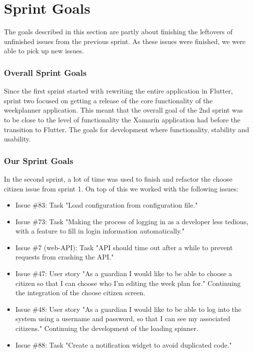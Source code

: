 \section{Sprint Goals}
\label{sect:sprintGoals2}
The goals described in this section are partly about finishing the leftovers of unfinished issues from the previous sprint. As these issues were finished, we were able to pick up new issues.

\subsubsection{Overall Sprint Goals}
Since the first sprint started with rewriting the entire application in Flutter, sprint two focused on getting a release of the core functionality of the weekplanner application. This meant that the overall goal of the 2nd sprint was to be close to the level of functionality the Xamarin application had before the transition to Flutter. The goals for development where functionality, stability and usability. 

\subsubsection{Our Sprint Goals}
In the second sprint, a lot of time was used to finish and refactor the choose citizen issue from sprint 1. On top of this we worked with the following issues:

\begin{itemize}
    \item Issue \#83: Task "Load configuration from configuration file."
    \item Issue \#73: Task "Making the process of logging in as a developer less tedious, with a feature to fill in login information automatically."
    \item Issue \#7 (web-API): Task "API should time out after a while to prevent requests from crashing the API."
    \item Issue \#47: User story "As a guardian I would like to be able to choose a citizen so that I can choose who I’m editing the week plan for."
    \subitem Continuing the integration of the choose citizen screen.
    \item Issue \#48: User story "As a guardian I would like to be able to log into the system using a username and password, so that I can see my associated citizens."
    \subitem Continuing the development of the loading spinner.
    \item Issue \#88: Task "Create a notification widget to avoid duplicated code."
\end{itemize}